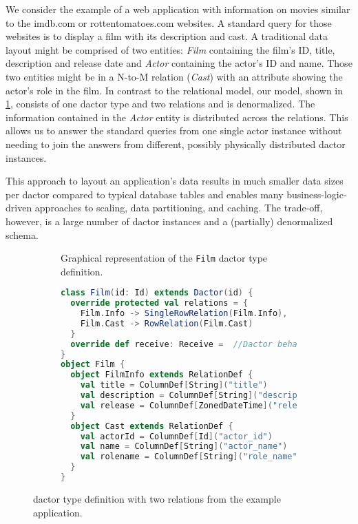     We consider the example of a web application with information on movies similar to the imdb.com or rottentomatoes.com websites.
    A standard query for those websites is to display a film with its description and cast.
    A traditional data layout might be comprised of two entities: \textit{Film} containing the film's ID, title, description and release date and \textit{Actor} containing the actor's ID and name.
    Those two entities might be in a N-to-M relation (\textit{Cast}) with an attribute showing the actor's role in the film.
    In contrast to the relational model, our model, shown in \cref{fig:film_diagram}, consists of one \gls{dactor} type and two \glspl{relation} and is denormalized.
    The information contained in the \textit{Actor} entity is distributed across the  \glspl{relation}.
    This allows us to answer the standard queries from one single actor instance without needing to join the answers from different, possibly physically distributed \gls{dactor} instances.

    This approach to layout an application's data results in much smaller data sizes per \gls{dactor} compared to typical database tables and enables many business-logic-driven approaches to scaling, data partitioning, and caching.
    The trade-off, however, is a large number of \gls{dactor} instances and a (partially) denormalized schema.

    \begin{figure}
      \centering

      \begin{subfigure}[b]{0.44\textwidth}
        \centering
        
        \caption{Graphical representation of the \texttt{Film} \gls{dactor} type definition.}
        \label{fig:film_diagram}
      \end{subfigure}\hfill
      \begin{subfigure}[b]{0.54\textwidth}
        \centering
        \scriptsize
\begin{lstlisting}[language=Scala]
class Film(id: Id) extends Dactor(id) {
  override protected val relations = {
    Film.Info -> SingleRowRelation(Film.Info),
    Film.Cast -> RowRelation(Film.Cast)
  }
  override def receive: Receive =  //Dactor behavior
}
object Film {
  object FilmInfo extends RelationDef {
    val title = ColumnDef[String]("title")
    val description = ColumnDef[String]("description")
    val release = ColumnDef[ZonedDateTime]("release")
  }
  object Cast extends RelationDef {
    val actorId = ColumnDef[Id]("actor_id")
    val name = ColumnDef[String]("actor_name")
    val rolename = ColumnDef[String]("role_name")
  }
}
\end{lstlisting}
        \label{lst:film_definition}
      \end{subfigure}
      \caption[\texttt{Film} Dactor type definition with two relations of the example application.]{ \gls{dactor} type definition with two relations from the example application.}
      \label{fig:film_dactor_definition}
    \end{figure}

